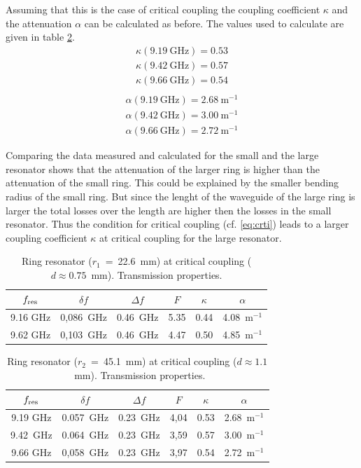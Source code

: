 Assuming that this is the case of critical coupling the coupling coefficient $\kappa$ and the attenuation $\alpha$ can be calculated as before. The values used to calculate are given in table \ref{tab:ring_gross}.
\begin{equation}
\begin{split}
\kappa(9.19~\mathrm{GHz})=0.53\\
\kappa(9.42~\mathrm{GHz})=0.57\\
\kappa(9.66~\mathrm{GHz})=0.54\\
\end{split}
\label{eq:}
\end{equation}
\begin{equation}
\begin{split}
\alpha(9.19~\mathrm{GHz})=2.68~\mathrm{m}^{-1}\\
\alpha(9.42~\mathrm{GHz})=3.00~\mathrm{m}^{-1}\\
\alpha(9.66~\mathrm{GHz})=2.72~\mathrm{m}^{-1}
\end{split}
\label{eq:}
\end{equation}

Comparing the data measured and calculated for the small and the large resonator shows that the attenuation of the larger ring is higher than the attenuation of the small ring. This could be explained by the smaller bending radius of the small ring. 
But since the lenght of the waveguide of the large ring is larger the total losses over the length are higher then the losses in the small resonator. Thus the condition for critical coupling (cf. \eqref{eq:crti}) leads to a larger coupling coefficient $\kappa$ at critical coupling for the large resonator.

\begin{table}%
\centering
\caption{Ring resonator ($r_1$~=~22.6~mm) at critical coupling ($d \approx 0.75$~mm). Transmission properties.}
\begin{tabular}{cccccc}
\toprule
$f_{\mathrm{res}}$	& $\delta f$	& $\Delta f$ & $F$ & $\kappa$ & $\alpha$\\
\midrule
9.16 GHz	& 0,086~GHz	& 0.46~GHz	&	5.35&	0.44 & 4.08~m$^{-1}$\\
9.62 GHz	& 0,103~GHz	& 0.46~GHz	&	4.47	&	0.50 & 4.85~m$^{-1}$\\
\bottomrule 
\end{tabular}
\label{tab:ring_klein}
\end{table}

\begin{table}%
\centering
\caption{Ring resonator ($r_2$~=~45.1~mm) at critical coupling ($d \approx 1.1$~mm). Transmission properties.}
\begin{tabular}{cccccc}
\toprule
$f_{\mathrm{res}}$	& $\delta f$	& $\Delta f$ & $F$ & $\kappa$ & $\alpha$\\
\midrule
9.19 GHz	& 0.057~GHz	& 0.23~GHz	& 4,04	& 0.53	& 2.68~m$^{-1}$ \\
9.42~GHz	&	0.064~GHz	&	0.23~GHz	& 3,59	& 0.57	&	3.00~m$^{-1}$\\
9.66 GHz	& 0,058~GHz	& 0.23~GHz	&	3,97	&	0.54	& 2.72~m$^{-1}$ \\
\bottomrule 
\end{tabular}
\label{tab:ring_gross}
\end{table}


